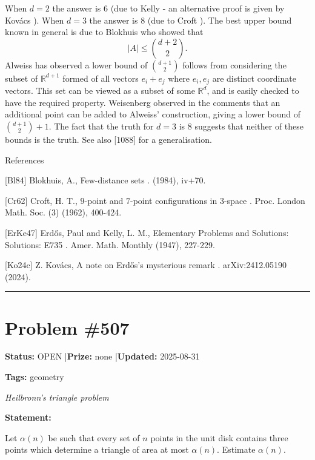 \documentclass{article}
\begin{document}
When $d=2$ the answer is $6$ (due to Kelly \cite{ErKe47} - an alternative proof is given by Kov\'{a}cs \cite{Ko24c}). When $d=3$ the answer is $8$ (due to Croft \cite{Cr62}). The best upper bound known in general is due to Blokhuis \cite{Bl84} who showed that\[\lvert A\rvert \leq \binom{d+2}{2}.\]Alweiss has observed a lower bound of $\binom{d+1}{2}$ follows from considering the subset of $\mathbb{R}^{d+1}$ formed of all vectors $e_i+e_j$ where $e_i,e_j$ are distinct coordinate vectors. This set can be viewed as a subset of some $\mathbb{R}^d$, and is easily checked to have the required property. Weisenberg observed in the comments that an additional point can be added to Alweiss' construction, giving a lower bound of $\binom{d+1}{2}+1$. The fact that the truth for $d=3$ is $8$ suggests that neither of these bounds is the truth. See also [1088] for a generalisation.




References

[Bl84] Blokhuis, A., Few-distance sets . (1984), iv+70.

[Cr62] Croft, H. T., $9$-point and $7$-point configurations in $3$-space . Proc. London Math. Soc. (3) (1962), 400-424.

[ErKe47] Erd\H{o}s, Paul and Kelly, L. M., Elementary Problems and Solutions: Solutions: E735 . Amer. Math. Monthly (1947), 227-229.

[Ko24c] Z. Kov\'{a}cs, A note on Erd\H{o}s's mysterious remark . arXiv:2412.05190 (2024).

\noindent\rule{\linewidth}{0.4pt}


\section{Problem \#507}
\label{prob:507}

\noindent\textbf{Status:} OPEN \quad|\quad \textbf{Prize:} none \quad|\quad \textbf{Updated:} 2025-08-31

\noindent\textbf{Tags:} geometry

\medskip
\noindent\textit{Heilbronn's triangle problem}


\noindent\textbf{Statement:}

Let $\alpha(n)$ be such that every set of $n$ points in the unit disk contains three points which determine a triangle of area at most $\alpha(n)$. Estimate $\alpha(n)$.
\end{document}
